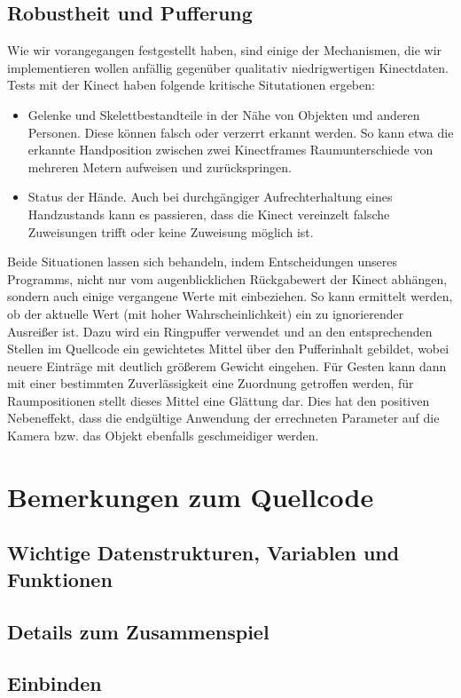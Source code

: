 \documentclass[11pt,a4paper]{scrartcl}
\begin{document}
	\subsection{Robustheit und Pufferung}
	Wie wir vorangegangen festgestellt haben, sind einige der Mechanismen, die wir implementieren wollen anfällig gegenüber qualitativ niedrigwertigen Kinectdaten. Tests mit der Kinect haben folgende kritische Situtationen ergeben:
	\begin{itemize}
		\item Gelenke und Skelettbestandteile in der Nähe von Objekten und anderen Personen. Diese können falsch oder verzerrt erkannt werden. So kann etwa die erkannte Handposition zwischen zwei Kinectframes Raumunterschiede von mehreren Metern aufweisen und zurückspringen.
		\item Status der Hände. Auch bei durchgängiger Aufrechterhaltung eines Handzustands kann es passieren, dass die Kinect vereinzelt falsche Zuweisungen trifft oder keine Zuweisung möglich ist.
	\end{itemize}
	Beide Situationen lassen sich behandeln, indem Entscheidungen unseres Programms, nicht nur vom augenblicklichen Rückgabewert der Kinect abhängen, sondern auch einige vergangene Werte mit einbeziehen. So kann ermittelt werden, ob der aktuelle Wert (mit hoher Wahrscheinlichkeit) ein zu ignorierender Ausreißer ist. Dazu wird ein Ringpuffer verwendet und an den entsprechenden Stellen im Quellcode ein gewichtetes Mittel über den Pufferinhalt gebildet, wobei neuere Einträge mit deutlich größerem Gewicht eingehen. Für Gesten kann dann mit einer bestimmten Zuverlässigkeit eine Zuordnung getroffen werden, für Raumpositionen stellt dieses Mittel eine Glättung dar. Dies hat den positiven Nebeneffekt, dass die endgültige Anwendung der errechneten Parameter auf die Kamera bzw. das Objekt ebenfalls geschmeidiger werden.
\section{Bemerkungen zum Quellcode}
	\subsection{Wichtige Datenstrukturen, Variablen und Funktionen}
	\subsection{Details zum Zusammenspiel}
	\subsection{Einbinden}
\end{document}
